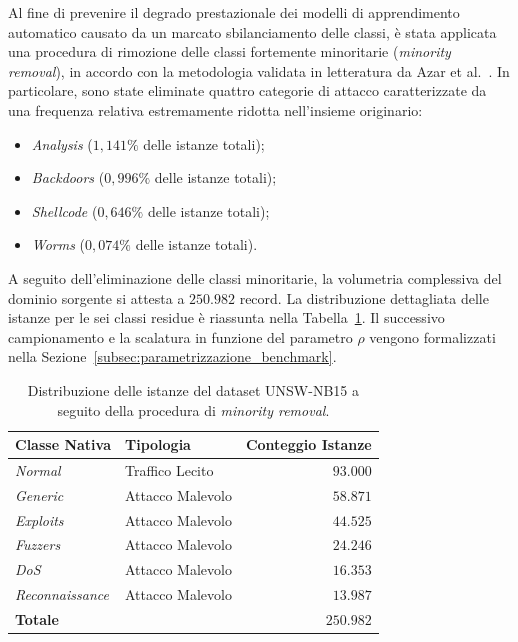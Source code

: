 Al fine di prevenire il degrado prestazionale dei modelli di apprendimento automatico causato da un marcato sbilanciamento delle classi, è stata applicata una procedura di rimozione delle classi fortemente minoritarie (\textit{minority removal}), in accordo con la metodologia validata in letteratura da Azar et al.~\cite{azar2023}. In particolare, sono state eliminate quattro categorie di attacco caratterizzate da una frequenza relativa estremamente ridotta nell'insieme originario:
\begin{itemize}
    \item \textit{Analysis} ($1{,}141\%$ delle istanze totali);
    \item \textit{Backdoors} ($0{,}996\%$ delle istanze totali);
    \item \textit{Shellcode} ($0{,}646\%$ delle istanze totali);
    \item \textit{Worms} ($0{,}074\%$ delle istanze totali).
\end{itemize}

A seguito dell'eliminazione delle classi minoritarie, la volumetria complessiva del dominio sorgente si attesta a $250.982$ record. 
La distribuzione dettagliata delle istanze per le sei classi residue è riassunta nella Tabella~\ref{tab:unsw_distribution}. 
Il successivo campionamento e la scalatura in funzione del parametro $\rho$ vengono formalizzati nella Sezione~\ref{subsec:parametrizzazione_benchmark}.

\begin{table}[H]
    \centering
    \small
    \caption{Distribuzione delle istanze del dataset UNSW-NB15 a seguito della procedura di \textit{minority removal}.}
    \label{tab:unsw_distribution}
    \begin{tabular}{llr}
        \toprule
        \textbf{Classe Nativa} & \textbf{Tipologia} & \textbf{Conteggio Istanze} \\
        \midrule
        \textit{Normal} & Traffico Lecito & $93.000$ \\
        \textit{Generic} & Attacco Malevolo & $58.871$ \\
        \textit{Exploits} & Attacco Malevolo & $44.525$ \\
        \textit{Fuzzers} & Attacco Malevolo & $24.246$ \\
        \textit{DoS} & Attacco Malevolo & $16.353$ \\
        \textit{Reconnaissance} & Attacco Malevolo & $13.987$ \\
        \hline
        \textbf{Totale} & & $\mathbf{250.982}$ \\
        \bottomrule
    \end{tabular}
\end{table}

